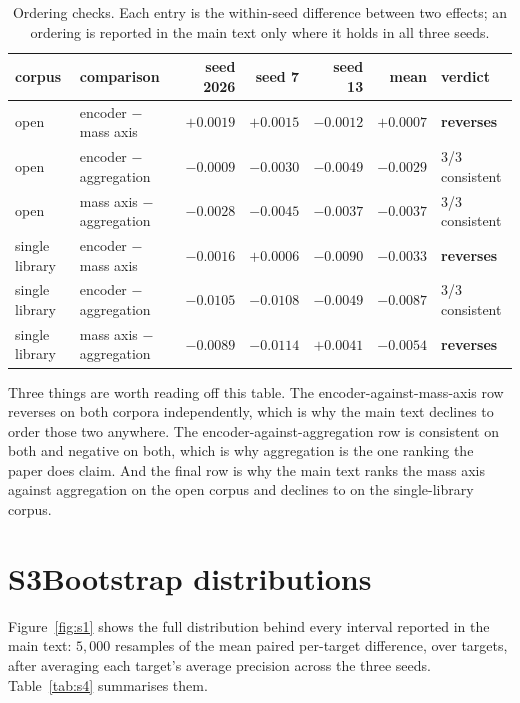 \documentclass[11pt]{article}
\begin{document}
\begin{table}[htbp]
\centering
\caption{Ordering checks. Each entry is the within-seed difference between two
effects; an ordering is reported in the main text only where it holds in all three
seeds.}
\label{tab:s3}
\small
\begin{tabular}{l l r r r r l}
\toprule
corpus & comparison & seed 2026 & seed 7 & seed 13 & mean & verdict \\
\midrule
open & encoder $-$ mass axis   & $+0.0019$ & $+0.0015$ & $-0.0012$ & $+0.0007$ & \textbf{reverses} \\
open & encoder $-$ aggregation & $-0.0009$ & $-0.0030$ & $-0.0049$ & $-0.0029$ & 3/3 consistent \\
open & mass axis $-$ aggregation & $-0.0028$ & $-0.0045$ & $-0.0037$ & $-0.0037$ & 3/3 consistent \\
\midrule
single library & encoder $-$ mass axis   & $-0.0016$ & $+0.0006$ & $-0.0090$ & $-0.0033$ & \textbf{reverses} \\
single library & encoder $-$ aggregation & $-0.0105$ & $-0.0108$ & $-0.0049$ & $-0.0087$ & 3/3 consistent \\
single library & mass axis $-$ aggregation & $-0.0089$ & $-0.0114$ & $+0.0041$ & $-0.0054$ & \textbf{reverses} \\
\bottomrule
\end{tabular}
\end{table}

Three things are worth reading off this table. The encoder-against-mass-axis row
reverses on both corpora independently, which is why the main text declines to order
those two anywhere. The encoder-against-aggregation row is consistent on both and
negative on both, which is why aggregation is the one ranking the paper does claim.
And the final row is why the main text ranks the mass axis against aggregation on
the open corpus and declines to on the single-library corpus.

\section*{S3\quad Bootstrap distributions}

Figure~\ref{fig:s1} shows the full distribution behind every interval reported in
the main text: $5{,}000$ resamples of the mean paired per-target difference, over
targets, after averaging each target's average precision across the three seeds.
Table~\ref{tab:s4} summarises them.
\end{document}
